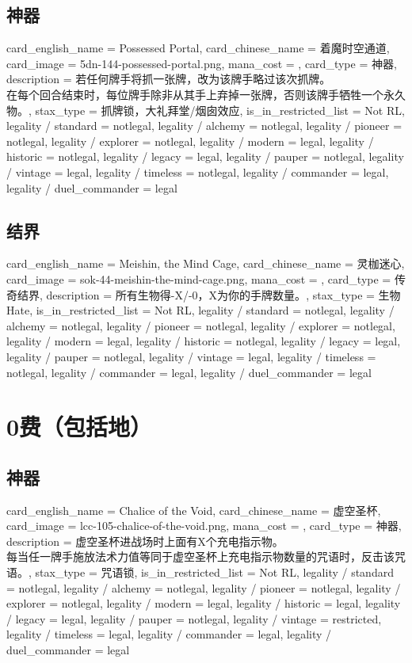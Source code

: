 \documentclass[lang = cn, color = black, 10pt]{AllThatStax}
\begin{document}
\section{神器}

\card
{
	card_english_name = {Possessed Portal},
	card_chinese_name = {着魔时空通道},
	card_image = 5dn-144-possessed-portal.png,
	mana_cost = ,
	card_type = 神器,
	description = {若任何牌手将抓一张牌，改为该牌手略过该次抓牌。\\
在每个回合结束时，每位牌手除非从其手上弃掉一张牌，否则该牌手牺牲一个永久物。},
	stax_type = 抓牌锁，大礼拜堂/烟囱效应,
	is_in_restricted_list = Not RL,
	legality / standard = notlegal,
	legality / alchemy = notlegal,
	legality / pioneer = notlegal,
	legality / explorer = notlegal,
	legality / modern = legal,
	legality / historic = notlegal,
	legality / legacy = legal,
	legality / pauper = notlegal,
	legality / vintage = legal,
	legality / timeless = notlegal,
	legality / commander = legal,
	legality / duel_commander = legal
}

\section{结界}

\card
{
	card_english_name = {Meishin, the Mind Cage},
	card_chinese_name = {灵枷迷心},
	card_image = sok-44-meishin-the-mind-cage.png,
	mana_cost = ,
	card_type = 传奇结界,
	description = {所有生物得-X/-0，X为你的手牌数量。},
	stax_type = 生物Hate,
	is_in_restricted_list = Not RL,
	legality / standard = notlegal,
	legality / alchemy = notlegal,
	legality / pioneer = notlegal,
	legality / explorer = notlegal,
	legality / modern = legal,
	legality / historic = notlegal,
	legality / legacy = legal,
	legality / pauper = notlegal,
	legality / vintage = legal,
	legality / timeless = notlegal,
	legality / commander = legal,
	legality / duel_commander = legal
}

\chapter{0费（包括地）}

\section{神器}

\card
{
	card_english_name = {Chalice of the Void},
	card_chinese_name = {虚空圣杯},
	card_image = lcc-105-chalice-of-the-void.png,
	mana_cost = ,
	card_type = 神器,
	description = {虚空圣杯进战场时上面有X个充电指示物。\\
每当任一牌手施放法术力值等同于虚空圣杯上充电指示物数量的咒语时，反击该咒语。},
	stax_type = 咒语锁,
	is_in_restricted_list = Not RL,
	legality / standard = notlegal,
	legality / alchemy = notlegal,
	legality / pioneer = notlegal,
	legality / explorer = notlegal,
	legality / modern = legal,
	legality / historic = legal,
	legality / legacy = legal,
	legality / pauper = notlegal,
	legality / vintage = restricted,
	legality / timeless = legal,
	legality / commander = legal,
	legality / duel_commander = legal
}
\end{document}
